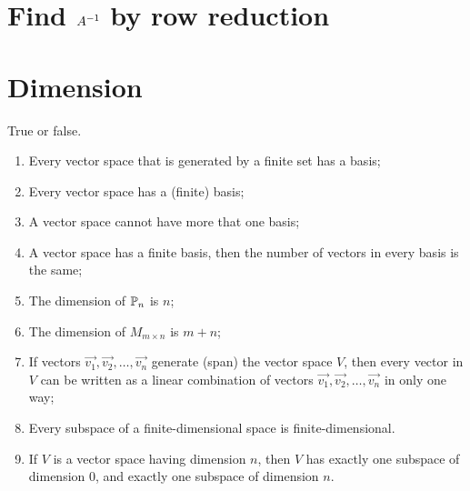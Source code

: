 \documentclass{article}
\def\by{\times}
\begin{document}
\section{Find $A^{-1}$ by row reduction}
\section{Dimension}

\begin{exercise}
  True or false.
  \begin{enumerate}
    \item Every vector space that is generated by a finite set has a basis;
    \item Every vector space has a (finite) basis;
    \item A vector space cannot have more that one basis;
    \item A vector space has a finite basis, then the number of vectors
      in every basis is the same;
    \item The dimension of $\P_n$ is $n$;
    \item The dimension of $M_{m\by n}$ is $m+n$;
    \item If vectors $\vec{v_1},\vec{v_2},\dots,\vec{v_n}$ generate (span)
      the vector space $V$, then every vector in $V$ can be written as
      a linear combination of vectors $\vec{v_1},\vec{v_2},\dots,\vec{v_n}$
      in only one way;
    \item Every subspace of a finite-dimensional space is finite-dimensional.
    \item If $V$ is a vector space having dimension $n$, then $V$ has exactly
      one subspace of dimension $0$, and exactly one subspace of dimension
      $n$.
  \end{enumerate}
\end{exercise}
\end{document}
